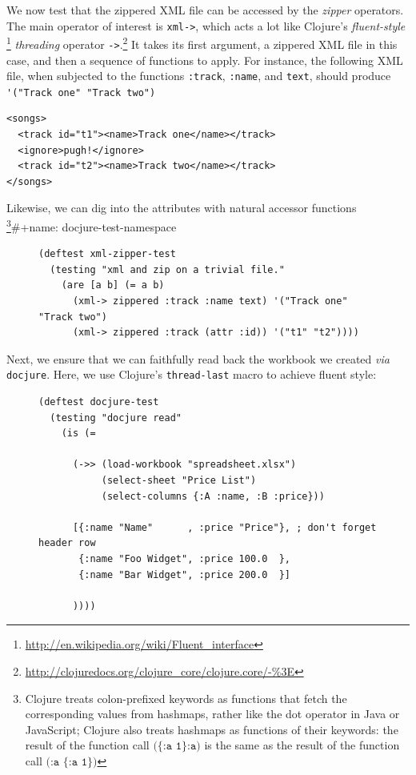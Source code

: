 \documentclass[11pt]{article}
\begin{document}
We now test that the zippered XML file can be accessed by the \emph{zipper}
operators. The main operator of interest is \verb|xml->|, which acts
a lot like Clojure's
\emph{fluent-style} \footnote{\url{http://en.wikipedia.org/wiki/Fluent_interface}}
\emph{threading} operator
\verb|->|.\footnote{\url{http://clojuredocs.org/clojure_core/clojure.core/-\%3E}}
It takes its first argument, a zippered XML file in this case, and
then a sequence of functions to apply. For instance, the following
XML file, when subjected to the functions \verb|:track|,
\verb|:name|, and \verb|text|, should produce \verb|'("Track one" "Track two")|
\begin{verbatim}
<songs>
  <track id="t1"><name>Track one</name></track>
  <ignore>pugh!</ignore>
  <track id="t2"><name>Track two</name></track>
</songs>
\end{verbatim}
Likewise, we can dig into the attributes with natural accessor
functions \footnote{Clojure treats colon-prefixed keywords as functions that
fetch the corresponding values from hashmaps, rather like the dot
operator in Java or JavaScript; Clojure also treats hashmaps as
functions of their keywords: the result of the function call
$\texttt{(\{:a 1\} :a)}$ is the same as the result of the function call
$\texttt{(:a \{:a 1\})}$}\#+name: docjure-test-namespace

\begin{figure}[H]
\label{test-zippered}
\begin{verbatim}
(deftest xml-zipper-test
  (testing "xml and zip on a trivial file."
    (are [a b] (= a b)
      (xml-> zippered :track :name text) '("Track one" "Track two")
      (xml-> zippered :track (attr :id)) '("t1" "t2"))))
\end{verbatim}
\end{figure}

Next, we ensure that we can faithfully read back the workbook we
created \emph{via} \verb|docjure|. Here, we use Clojure's
\verb|thread-last| macro to achieve fluent style:
\begin{figure}[H]
\label{test-docjure-read}
\begin{verbatim}
(deftest docjure-test
  (testing "docjure read"
    (is (=

      (->> (load-workbook "spreadsheet.xlsx")
           (select-sheet "Price List")
           (select-columns {:A :name, :B :price}))

      [{:name "Name"      , :price "Price"}, ; don't forget header row
       {:name "Foo Widget", :price 100.0  },
       {:name "Bar Widget", :price 200.0  }]

      ))))
\end{verbatim}
\end{figure}
\end{document}

